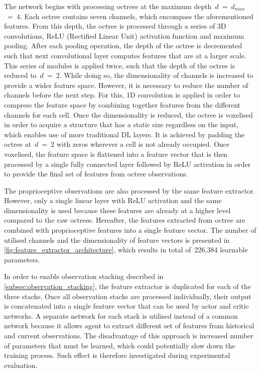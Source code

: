 The network begins with processing octrees at the maximum depth~\(d\)~=~\(d_{max}\)~=~\(4\). Each octree contains seven channels, which encompass the aforementioned features. From this depth, the octree is processed through a series of 3D convolutions, ReLU (Rectified Linear Unit) activation function and maximum pooling. After each pooling operation, the depth of the octree is decremented such that next convolutional layer computes features that are at a larger scale. This series of modules is applied twice, such that the depth of the octree is reduced to~\(d\)~=~\(2\). While doing so, the dimensionality of channels is increased to provide a wider feature space. However, it is necessary to reduce the number of channels before the next step. For this, 1D convolution is applied in order to compress the feature space by combining together features from the different channels for each cell. Once the dimensionality is reduced, the octree is voxelised in order to acquire a structure that has a static size regardless on the input, which enables use of more traditional DL layers. It is achieved by padding the octree at~\(d\)~=~\(2\) with zeros wherever a cell is not already occupied. Once voxelised, the feature space is flattened into a feature vector that is then processed by a single fully connected layer followed by ReLU activation in order to provide the final set of features from octree observations.

The proprioceptive observations are also processed by the same feature extractor. However, only a single linear layer with ReLU activation and the same dimensionality is used because these features are already at a higher level compared to the raw octrees. Hereafter, the features extracted from octree are combined with proprioceptive features into a single feature vector. The number of utilised channels and the dimensionality of feature vectors is presented in \autoref{fig:feature_extractor_architecture}, which results in total of~226,384 learnable parameters.

In order to enable observation stacking described in \autoref{subsec:observation_stacking}, the feature extractor is duplicated for each of the three stacks. Once all observation stacks are processed individually, their output is concatenated into a single feature vector that can be used by actor and critic networks. A separate network for each stack is utilised instead of a common network because it allows agent to extract different set of features from historical and current observations. The disadvantage of this approach is increased number of parameters that must be learned, which could potentially slow down the training process. Such effect is therefore investigated during experimental evaluation.


